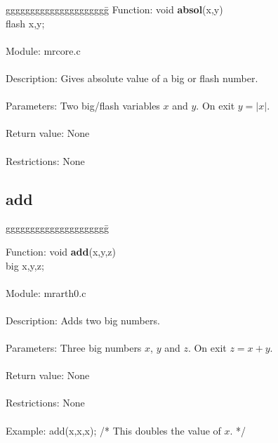 \begin{tabbing}
ggggggggggggggggggggg\= \kill
      Function:      \>void {\bf absol}(x,y)    \\
                     \>flash x,y;               \\
      \ \\
      Module:        \>mrcore.c                 \\
      \ \\
      Description:   \>Gives absolute value of a big or flash number. \\
      \ \\
      Parameters:    \>Two big/flash variables $x$ and $y$. On exit $y=|x|$. \\  
      \ \\
      Return value:  \>None \\
      \ \\
      Restrictions:  \>None \\

\end{tabbing}

\subsection{add}

\begin{tabbing}
ggggggggggggggggggggg\= \kill

      Function:      \>void {\bf add}(x,y,z)   \\  
                     \>big x,y,z;\\
      \ \\
      Module:        \>mrarth0.c \\
      \ \\
      Description:   \>Adds two big numbers. \\
      \ \\
      Parameters:    \>Three big numbers $x$, $y$ and $z$. On exit $z=x+y$.\\
      \ \\
      Return value:  \>None \\
      \ \\
      Restrictions:  \>None \\
      \ \\
      Example:       \>add(x,x,x); /* This doubles the value of $x$. */ \\

\end{tabbing}

